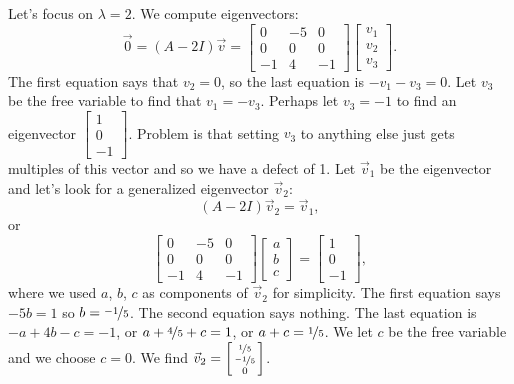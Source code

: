 \begin{example}
Let's focus on $\lambda = 2$.  We compute eigenvectors:
\begin{equation*}
\vec{0} =
(A - 2 I) \vec{v}
=
\begin{bmatrix}
0 & -5 & 0 \\
0 & 0 & 0 \\
-1 & 4 & -1
\end{bmatrix}
\begin{bmatrix}
v_1 \\ v_2 \\ v_3
\end{bmatrix}
.
\end{equation*}
The first equation says that $v_2 = 0$, so the last equation
is $-v_1 -v_3 = 0$.  Let $v_3$ be the free variable to find
that $v_1 = -v_3$.  Perhaps let $v_3 = -1$ to find an eigenvector
$\left[ \begin{smallmatrix} 1 \\ 0 \\ -1 \end{smallmatrix} \right]$.
Problem is that setting $v_3$ to anything else just gets multiples
of this vector and so we have a defect of 1.
Let $\vec{v}_1$ be the eigenvector and let's look for
a generalized eigenvector $\vec{v}_2$:
\begin{equation*}
(A - 2 I) \vec{v}_2 = \vec{v}_1 , 
\end{equation*}
or
\begin{equation*}
\begin{bmatrix}
0 & -5 & 0 \\
0 & 0 & 0 \\
-1 & 4 & -1
\end{bmatrix}
\begin{bmatrix}
a \\ b \\ c
\end{bmatrix}
=
\begin{bmatrix}
1 \\ 0 \\ -1
\end{bmatrix} ,
\end{equation*}
where we used $a$, $b$, $c$ as components of $\vec{v}_2$ for simplicity.
The first equation says $-5b = 1$ so $b = \nicefrac{-1}{5}$.  The
second equation says nothing.
The last equation is $-a + 4b - c = -1$, or
$a + \nicefrac{4}{5} + c = 1$, or
$a + c = \nicefrac{1}{5}$.  We let $c$ be the free variable and we
choose $c=0$.  We find
$\vec{v}_2 = \left[ \begin{smallmatrix} \nicefrac{1}{5} \\ \nicefrac{-1}{5}
\\ 0 \end{smallmatrix} \right]$.


\end{example}
